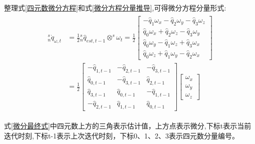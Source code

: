 \documentclass[12pt,a4paper]{article}
\begin{document}
整理式\ref{四元数微分方程}和式\ref{微分方程分量推导},可得微分方程分量形式:
\begin{eqnarray}
    \begin{aligned}
    ^s_n\dot{q}_{\omega,t}&=\frac{1}{2}{^s_n\hat{q}_{est,t-1}}\otimes^s\omega_t
    =\frac{1}{2}
    \left[\begin{array}{c}
            - \hat{q}_1\omega_x - \hat{q}_2 \omega_y - \hat{q}_3 \omega_z \\
              \hat{q}_0\omega_x + \hat{q}_2 \omega_z - \hat{q}_3 \omega_y \\
              \hat{q}_0\omega_y - \hat{q}_1 \omega_z + \hat{q}_3 \omega_x \\
              \hat{q}_0\omega_z + \hat{q}_1 \omega_y - \hat{q}_2 \omega_x
    \end{array}\right] \\
    &=\frac{1}{2}
    \left[ \begin{array}{rrr}
            -\hat{q}_{1,t-1} & -\hat{q}_{2,t-1} & -\hat{q}_{3,t-1} \\
             \hat{q}_{0,t-1} & -\hat{q}_{3,t-1} &  \hat{q}_{2,t-1} \\
             \hat{q}_{3,t-1} &  \hat{q}_{0,t-1} & -\hat{q}_{1,t-1} \\
            -\hat{q}_{2,t-1} &  \hat{q}_{1,t-1} &  \hat{q}_{0,t-1}
    \end{array} \right]
    \left[\begin{array}{c}
            \omega_{x} \\
            \omega_{y} \\
            \omega_{z}
    \end{array}\right] \label{微分最终式}
    \end{aligned}
\end{eqnarray}

式\ref{微分最终式}中四元数上方的三角表示估计值，上方点表示微分,下标t表示当前迭代时刻,下标t-1表示上次迭代时刻，下标0、1、2、3表示四元数分量编号。
\end{document}

